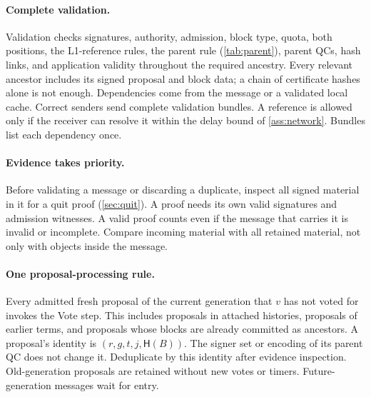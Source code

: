 \documentclass[11pt,a4paper]{article}
\newcommand{\Hash}{\mathsf H}
\begin{document}
\paragraph{Complete validation.}
Validation checks signatures, authority, admission, block type, quota,
both positions, the L1-reference rules, the parent rule
(\cref{tab:parent}), parent QCs, hash links, and application validity
throughout the required ancestry. Every relevant ancestor includes its
signed proposal and block data; a chain of certificate hashes alone is
not enough. Dependencies come from the message or a validated local
cache. Correct senders send complete validation bundles. A reference is
allowed only if the receiver can resolve it within the delay bound of
\cref{ass:network}. Bundles list each dependency once.

\paragraph{Evidence takes priority.}
Before validating a message or discarding a duplicate, inspect all signed
material in it for a quit proof (\cref{sec:quit}). A proof needs its own
valid signatures and admission witnesses. A valid proof counts even if
the message that carries it is invalid or incomplete. Compare incoming
material with all retained material, not only with objects inside the
message.

\paragraph{One proposal-processing rule.}
Every admitted fresh proposal of the current generation that $v$ has not
voted for invokes the Vote step. This includes proposals in attached
histories, proposals of earlier terms, and proposals whose blocks are
already committed as ancestors. A proposal's identity is
$(r,g,t,j,\Hash(B))$. The signer set or encoding of its parent QC does
not change it. Deduplicate by this identity after evidence inspection.
Old-generation proposals are retained without new votes or timers.
Future-generation messages wait for entry.
\end{document}

